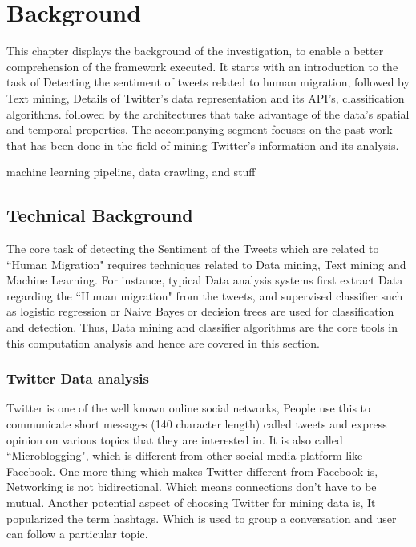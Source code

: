 \chapter{Background}\label{chap:background}
This chapter displays the background of the investigation, to enable a better comprehension of the framework executed. It starts with an introduction to the task of Detecting the sentiment of tweets related to human migration, followed by Text mining, Details of Twitter's data representation and its API's, classification algorithms. followed by the architectures that take advantage of the data’s spatial and temporal properties. The accompanying segment focuses on the past work that has been done in the field of mining Twitter's information and its analysis.

machine learning pipeline, data crawling, and stuff
    
\section{Technical Background}

The core task of detecting the Sentiment of the Tweets which are related to ``Human Migration" requires techniques related to Data mining, Text mining and Machine Learning. For instance, typical Data analysis systems first extract Data regarding the ``Human migration" from the tweets, and supervised classifier such as logistic regression or Naive Bayes or decision trees  are used for classification and detection. Thus, Data mining and classifier algorithms are the core tools in this computation analysis and hence are covered in this section.

\subsection{Twitter Data analysis}

Twitter is one of the well known online social networks, People use this to communicate short messages (140 character length) called tweets and express opinion on various topics that they are interested in. It is also called ``Microblogging", which is different from other social media platform like Facebook. One more thing which makes Twitter different from Facebook is, Networking is not bidirectional. Which means connections don't have to be mutual. Another  potential aspect of choosing Twitter for mining data is, It popularized the term hashtags. Which is used to group a  conversation and user can follow a particular topic.

